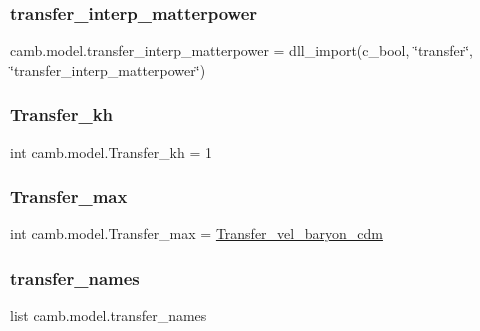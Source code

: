 \subsubsection{\texorpdfstring{transfer\+\_\+interp\+\_\+matterpower}{transfer\_interp\_matterpower}}
{\footnotesize\ttfamily camb.\+model.\+transfer\+\_\+interp\+\_\+matterpower = dll\+\_\+import(c\+\_\+bool, \char`\"{}transfer\char`\"{}, \char`\"{}transfer\+\_\+interp\+\_\+matterpower\char`\"{})}

\mbox{\label{namespacecamb_1_1model_a287714e4a7ae72477574c98616a855d6}} 
\subsubsection{\texorpdfstring{Transfer\+\_\+kh}{Transfer\_kh}}
{\footnotesize\ttfamily int camb.\+model.\+Transfer\+\_\+kh = 1}

\mbox{\label{namespacecamb_1_1model_a41edfb9edfe73c1817aec0d0bc425fab}} 
\subsubsection{\texorpdfstring{Transfer\+\_\+max}{Transfer\_max}}
{\footnotesize\ttfamily int camb.\+model.\+Transfer\+\_\+max = \mbox{\hyperlink{namespacecamb_1_1model_a111de36b8fbe4150ebb369051a847387}{Transfer\+\_\+vel\+\_\+baryon\+\_\+cdm}}}

\mbox{\label{namespacecamb_1_1model_a6f3d2cc1125ff8d4dd9b2a7a311929b1}} 
\subsubsection{\texorpdfstring{transfer\+\_\+names}{transfer\_names}}
{\footnotesize\ttfamily list camb.\+model.\+transfer\+\_\+names}

